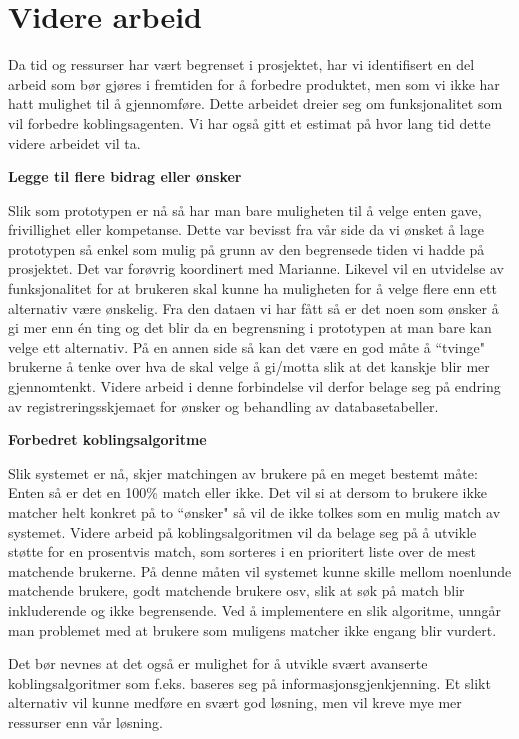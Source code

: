 \section{Videre arbeid}
Da tid og ressurser har vært begrenset i prosjektet, har vi identifisert en del arbeid som bør gjøres i fremtiden for å forbedre produktet, men som vi ikke har hatt mulighet til å gjennomføre. Dette arbeidet dreier seg om funksjonalitet som vil forbedre koblingsagenten. Vi har også gitt et estimat på hvor lang tid dette videre arbeidet vil ta.

{\bf Legge til flere bidrag eller ønsker}

Slik som prototypen er nå så har man bare muligheten til å velge enten gave, frivillighet eller kompetanse. Dette var bevisst fra vår side da vi ønsket å lage prototypen så enkel som mulig på grunn av den begrensede tiden vi hadde på prosjektet. Det var forøvrig koordinert med Marianne. Likevel vil en utvidelse av funksjonalitet for at brukeren skal kunne ha muligheten for å velge flere enn ett alternativ være ønskelig. Fra den dataen vi har fått så er det noen som ønsker å gi mer enn én ting og det blir da en begrensning i prototypen at man bare kan velge ett alternativ. På en annen side så kan det være en god måte å ``tvinge" brukerne å tenke over hva de skal velge å gi/motta slik at det kanskje blir mer gjennomtenkt. Videre arbeid i denne forbindelse vil derfor belage seg på endring av registreringsskjemaet for ønsker og behandling av databasetabeller.

{\bf Forbedret koblingsalgoritme}

Slik systemet er nå, skjer matchingen av brukere på en meget bestemt måte: Enten så er det en 100\% match eller ikke. Det vil si at dersom to brukere ikke matcher helt konkret på to ``ønsker" så vil de ikke tolkes som en mulig match av systemet. Videre arbeid på koblingsalgoritmen vil da belage seg på å utvikle støtte for en prosentvis match, som sorteres i en prioritert liste over de mest matchende brukerne. På denne måten vil systemet kunne skille mellom noenlunde matchende brukere, godt matchende brukere osv, slik at søk på match blir inkluderende og ikke begrensende. Ved å implementere en slik algoritme, unngår man problemet med at brukere som muligens matcher ikke engang blir vurdert.

Det bør nevnes at det også er mulighet for å utvikle svært avanserte koblingsalgoritmer som f.eks. baseres seg på informasjonsgjenkjenning. Et slikt alternativ vil kunne medføre en svært god løsning, men vil kreve mye mer ressurser enn vår løsning.

